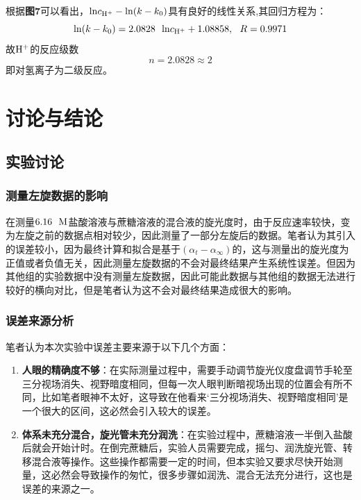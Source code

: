 \documentclass[12pt]{article}
\begin{document}
					\par
					根据\textbf{图7}可以看出，${\rm ln}c_{\rm H^{+}}-{\rm ln}(k-k_{0})$具有良好的线性关系,其回归方程为：
					$$
					{\rm ln}(k-k_{0})=2.0828\ \ {\rm ln}c_{\rm H^{+}}+1.08858,\ \ R=0.9971
					$$
					故$\rm H^{+}$的反应级数
					$$
					n=2.0828\approx2
					$$
					即对氢离子为二级反应。

					\section{讨论与结论}
					\subsection{实验讨论}
					\subsubsection{测量左旋数据的影响}
					在测量$6.16\ \ {\rm M}$盐酸溶液与蔗糖溶液的混合液的旋光度时，由于反应速率较快，变为左旋之前的数据点相对较少，因此测量了一部分左旋后的数据。笔者认为其引入的误差较小，因为最终计算和拟合是基于$(\alpha_{t}-\alpha_{\infty})$的，这与测量出的旋光度为正值或者负值无关，因此测量左旋数据的不会对最终结果产生系统性误差。但因为其他组的实验数据中没有测量左旋数据，因此可能此数据与其他组的数据无法进行较好的横向对比，但是笔者认为这不会对最终结果造成很大的影响。
					\subsubsection{误差来源分析}
					笔者认为本次实验中误差主要来源于以下几个方面：
					\begin{enumerate}
						\item \textbf{人眼的精确度不够}：在实际测量过程中，需要手动调节旋光仪度盘调节手轮至三分视场消失、视野暗度相同，但每一次人眼判断暗视场出现的位置会有所不同，比如笔者眼神不太好，这导致在他看来‘三分视场消失、视野暗度相同’是一个很大的区间，这必然会引入较大的误差。\par
						\item \textbf{体系未充分混合，旋光管未充分润洗}：在实验过程中，蔗糖溶液一半倒入盐酸后就会开始计时。在倒完蔗糖后，实验人员需要完成，摇匀、润洗旋光管、转移混合液等操作。这些操作都需要一定的时间，但本实验又要求尽快开始测量，这必然会导致操作的匆忙，很多步骤如润洗、混合无法充分进行，这也是误差的来源之一。\par
					\end{enumerate}
\end{document}
